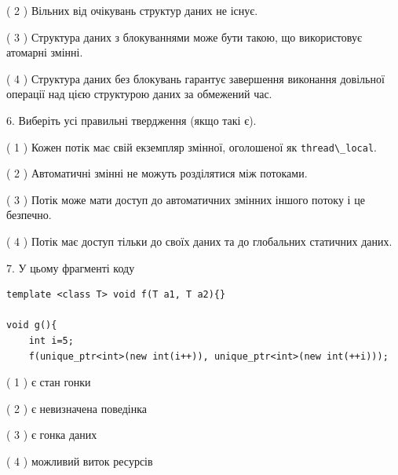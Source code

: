 \documentclass[12pt, ukrainian]{article}
\def\code#1{\Verb!#1!}
\begin{document}
\begin {large}
{( 2 ) Вільних від очікувань структур даних не існує.%

( 3 ) Структура даних з блокуваннями може бути такою, що використовує атомарні змінні.%

( 4 ) Структура даних без блокувань гарантує завершення виконання довільної операції над цією структурою даних за обмежений час.%
\newpage



\vspace{5mm}
6. Виберіть усі правильні твердження (якщо такі є).\par
\vspace{2mm}

( 1 ) Кожен потік має свій екземпляр змінної, оголошеної як \code{thread\_local}.%

( 2 ) Автоматичні змінні не можуть розділятися між потоками.%

( 3 ) Потік може мати доступ до автоматичних змінних іншого потоку і це безпечно.%

( 4 ) Потік має доступ тільки до своїх даних та до глобальних статичних даних.%


\vspace{5mm}
7. У цьому фрагменті коду
\begin{verbatim}
template <class T> void f(T a1, T a2){}

void g(){
    int i=5;
    f(unique_ptr<int>(new int(i++)), unique_ptr<int>(new int(++i)));
\end{verbatim}

( 1 ) є стан гонки%

( 2 ) є невизначена поведінка%

( 3 ) є гонка даних%

( 4 ) можливий виток ресурсів%
}
\end {large}
\end{document}
